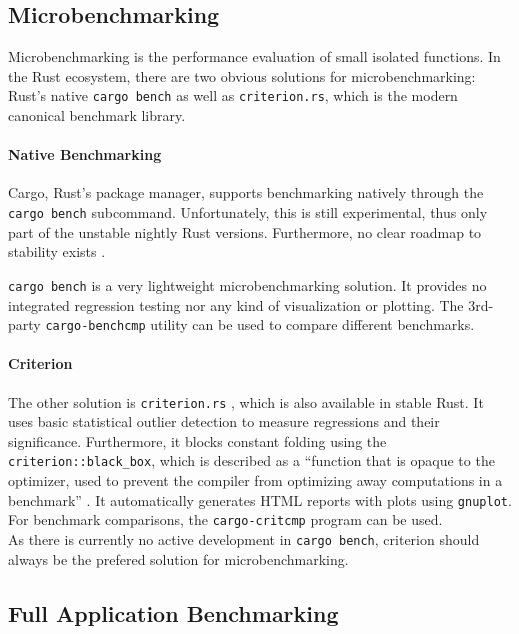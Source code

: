 \subsection{Microbenchmarking}
Microbenchmarking is the performance evaluation of small isolated functions. In the Rust ecosystem, there are two obvious solutions for microbenchmarking: Rust's native \texttt{cargo bench} as well as \texttt{criterion.rs}, which is the modern canonical benchmark library.

\paragraph{Native Benchmarking} Cargo, Rust's package manager, supports benchmarking natively through the \texttt{cargo bench} \cite{cargobench} subcommand. Unfortunately, this is still experimental, thus only part of the unstable nightly Rust versions. Furthermore, no clear roadmap to stability exists \cite{benchstable}.

\texttt{cargo bench} is a very lightweight microbenchmarking solution. It provides no integrated regression testing nor any kind of visualization or plotting. The 3rd-party \texttt{cargo-benchcmp} \cite{benchcmp} utility can be used to compare different benchmarks.

\paragraph{Criterion} The other solution is \texttt{criterion.rs} \cite{criterion}, which is also available in stable Rust. It uses basic statistical outlier detection to measure regressions and their significance. Furthermore, it blocks constant folding using the \texttt{criterion::black\_box}, which is described as a ``function that is opaque to the optimizer, used to prevent the compiler from optimizing away computations in a benchmark'' \cite{blackbox}. It automatically generates HTML reports with plots using \texttt{gnuplot}. For benchmark comparisons, the \texttt{cargo-critcmp} \cite{critcmp} program can be used.\\

As there is currently no active development in \texttt{cargo bench}, criterion should always be the prefered solution for microbenchmarking.

\subsection{Full Application Benchmarking}
